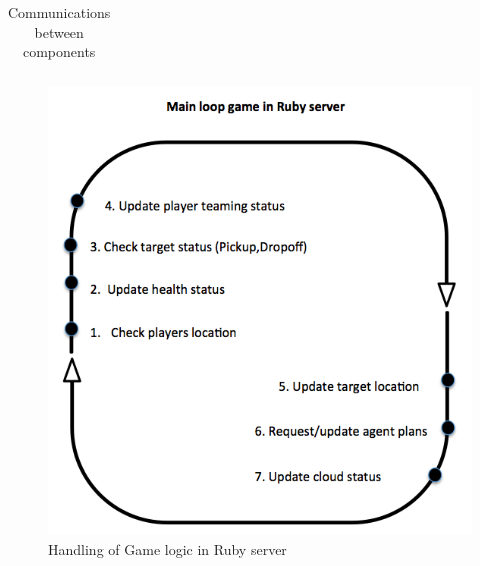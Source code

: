 \begin{table}[H]
\begin{tabular}{|l|l|l|}
\end{tabular}
\caption{Communications between components}
\end{table}

\begin{figure}[H]
  \centering
  \includegraphics[width=1\textwidth]{img/Appendix/Mainloop}
  \caption{Handling of Game logic in Ruby server}
\end{figure}

